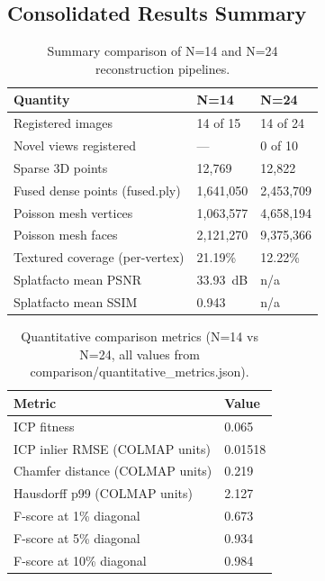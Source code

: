 \documentclass[12pt]{article}
\begin{document}
\FloatBarrier
\subsection*{Consolidated Results Summary}

\begin{table}[H]
\centering
\caption{Summary comparison of N=14 and N=24 reconstruction pipelines.}
\label{tab:summary}
\begin{tabular}{lll}
\toprule
Quantity & N=14 & N=24 \\
\midrule
Registered images & 14 of 15 & 14 of 24 \\
Novel views registered & --- & 0 of 10 \\
Sparse 3D points & 12,769 & 12,822 \\
Fused dense points (fused.ply) & 1,641,050 & 2,453,709 \\
Poisson mesh vertices & 1,063,577 & 4,658,194 \\
Poisson mesh faces & 2,121,270 & 9,375,366 \\
Textured coverage (per-vertex) & 21.19\% & 12.22\% \\
Splatfacto mean PSNR & 33.93~dB & n/a \\
Splatfacto mean SSIM & 0.943 & n/a \\
\bottomrule
\end{tabular}
\end{table}

\begin{table}[H]
\centering
\caption{Quantitative comparison metrics (N=14 vs N=24, all values from comparison/quantitative\_metrics.json).}
\label{tab:metrics_summary}
\begin{tabular}{ll}
\toprule
Metric & Value \\
\midrule
ICP fitness & 0.065 \\
ICP inlier RMSE (COLMAP units) & 0.01518 \\
Chamfer distance (COLMAP units) & 0.219 \\
Hausdorff p99 (COLMAP units) & 2.127 \\
F-score at 1\% diagonal & 0.673 \\
F-score at 5\% diagonal & 0.934 \\
F-score at 10\% diagonal & 0.984 \\
\bottomrule
\end{tabular}
\end{table}
\end{document}
